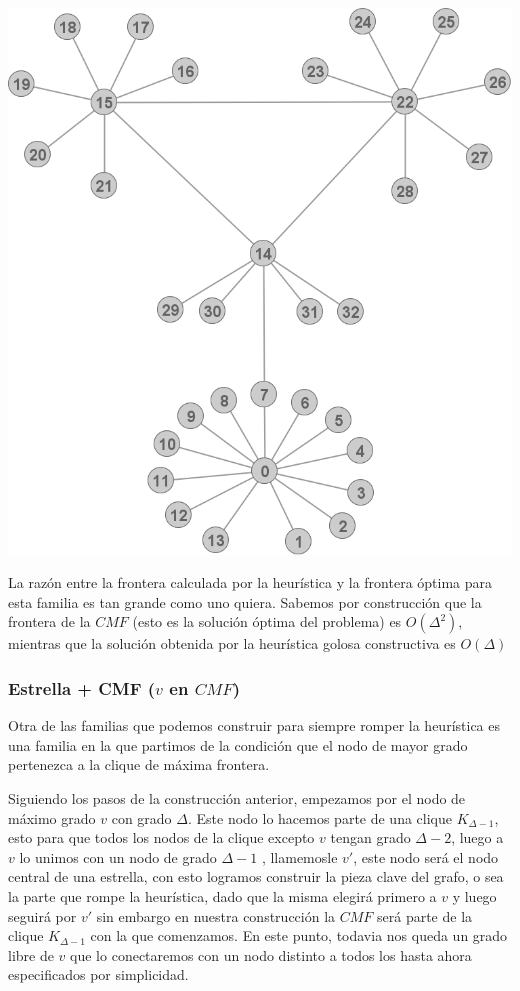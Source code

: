 \begin{center} 
	\includegraphics[scale = 0.5]{img/ej3/constructiva_golosa/faulty_st0.png} 
\end{center}

La raz\'on entre la frontera calculada por la heur\'istica y la frontera \'optima para 
esta familia es tan grande como uno quiera. Sabemos por construcci\'on que la frontera
de la $CMF$ (esto es la soluci\'on \'optima del problema) es $O(\Delta^2)$, mientras
que la soluci\'on obtenida por la heur\'istica golosa constructiva es $O(\Delta)$


\subsubsection{Estrella + CMF ($v$ en $CMF$)}

Otra de las familias que podemos construir para siempre romper la heur\'istica 
es una familia en la que partimos de la condici\'on que el nodo de mayor grado
pertenezca a la clique de m\'axima frontera. 

Siguiendo los pasos de la construcci\'on anterior, empezamos por el nodo de 
m\'aximo grado $v$ con grado $\Delta$. Este nodo lo hacemos parte de una clique
$K_{\Delta -1}$, esto para que todos los nodos de la clique excepto $v$ tengan
grado $\Delta -2$, luego a $v$ lo unimos con un nodo de grado $\Delta -1$ , 
llamemosle $v'$, este nodo ser\'a el nodo central de una estrella, 
con esto logramos construir la pieza clave del grafo, 
o sea la parte que rompe la heur\'istica, dado que la misma elegir\'a primero 
a $v$ y luego seguir\'a por $v'$ sin embargo en nuestra construcci\'on la $CMF$
ser\'a parte de la clique $K_{\Delta -1}$ con la que comenzamos.
En este punto, todavia nos queda un grado libre de $v$ que lo conectaremos con un
nodo distinto a todos los hasta ahora especificados por simplicidad.

